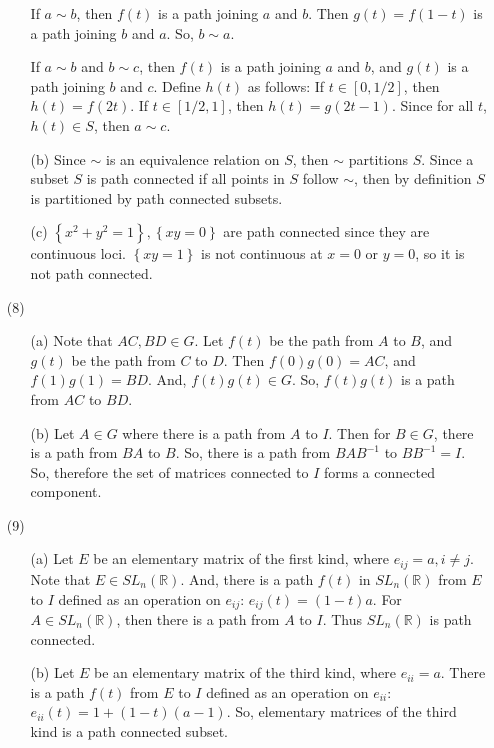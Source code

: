 \begin{itemize}
\begin{itemize}
If $a \sim b$, then $f(t)$ is a path joining $a$ and $b$. Then $g(t) = f(1 - t)$ is a path joining $b$ and $a$. So, $b \sim a$.

If $a \sim b$ and $b \sim c$, then $f(t)$ is a path joining $a$ and $b$, and $g(t)$ is a path joining $b$ and $c$. Define $h(t)$ as follows: If $t \in [0, 1/2]$, then $h(t) = f(2t)$. If $t \in [1/2, 1]$, then $h(t) = g(2t - 1)$. Since for all $t$, $h(t) \in S$, then $a \sim c$.
\item[(b)]
Since $\sim$ is an equivalence relation on $S$, then $\sim$ partitions $S$. Since a subset $S$ is path connected if all points in $S$ follow $\sim$, then by definition $S$ is partitioned by path connected subsets.
\item[(c)]
$\left\lbrace x^2 + y^2 = 1 \right\rbrace, \left\lbrace xy = 0 \right\rbrace$ are path connected since they are continuous loci. $\left\lbrace xy = 1 \right\rbrace$ is not continuous at $x = 0$ or $y = 0$, so it is not path connected.
\end{itemize}
\item[(8)]
\begin{itemize}
\item[(a)]
Note that $AC, BD \in G$. Let $f(t)$ be the path from $A$ to $B$, and $g(t)$ be the path from $C$ to $D$. Then $f(0)g(0) = AC$, and $f(1)g(1) = BD$. And, $f(t)g(t) \in G$. So, $f(t)g(t)$ is a path from $AC$ to $BD$.
\item[(b)]
Let $A \in G$ where there is a path from $A$ to $I$. Then for $B \in G$, there is a path from $BA$ to $B$. So, there is a path from $BAB^{-1}$ to $BB^{-1} = I$. So, therefore the set of matrices connected to $I$ forms a connected component.
\end{itemize}
\item[(9)]
\begin{itemize}
\item[(a)]
Let $E$ be an elementary matrix of the first kind, where $e_{ij} = a, i \neq j$. Note that $E \in SL_n(\mathbb{R})$. And, there is a path $f(t)$ in $SL_n(\mathbb{R})$ from $E$ to $I$ defined as an operation on $e_{ij}$: $e_{ij}(t) = (1 - t)a$. For $A \in SL_n(\mathbb{R})$, then there is a path from $A$ to $I$. Thus $SL_n(\mathbb{R})$ is path connected.
\item[(b)]
Let $E$ be an elementary matrix of the third kind, where $e_{ii} = a$. There is a path $f(t)$ from $E$ to $I$ defined as an operation on $e_{ii}$: $e_{ii}(t) = 1 + (1 - t)(a - 1)$. So, elementary matrices of the third kind is a path connected subset.


\end{itemize}
\end{itemize}
